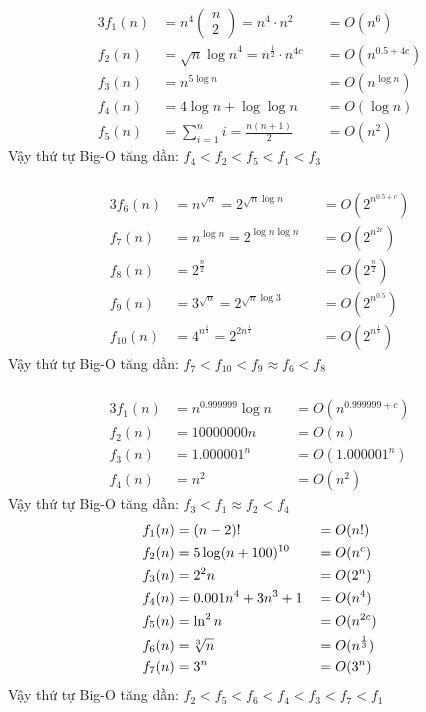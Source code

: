 \subsubsection{}
\begin{alignat*}{3}
     f_1(n) &= n^4\left(\begin{matrix}
         n\\2
     \end{matrix}\right)=n^4\cdot n^2  &&=O(n^6) \\
     f_2(n) &= \sqrt{n}{\log n}^4 = n^\frac{1}{2}\cdot n^{4c} &&= O(n^{0.5+4c}) \\
     f_3(n) &= n^{5\log n} &&= O(n^{\log n}) \\
     f_4(n) &= 4\log n + \log \log n &&=O(\log n)\\
     f_5(n) &= \sum_{i=1}^n i = \frac{n(n+1)}{2} &&= O(n^2)
\end{alignat*}
Vậy thứ tự Big-O tăng dần: $f_4 < f_2 < f_5 < f_1 < f_3$
\subsubsection{}
\begin{alignat*}{3}
     f_6(n) &= n^{\sqrt{n}} = 2^{\sqrt{n} \log n} &&=O(2^{n^{0.5 +c}}) \\
     f_7(n) &= n^{\log n} = 2^{\log n \log n} &&= O(2^{n^{2c}}) \\
     f_8(n) &= 2^{\frac{n}{2}} &&= O(2^{\frac{n}{2}}) \\
     f_9(n) &= 3^{\sqrt{n}} = 2^{\sqrt{n} \log 3} &&=O(2^{n^{0.5}})\\
     f_{10}(n) &= 4^{n^{\frac{1}{4}}} = 2^{2n^{\frac{1}{4}}} &&= O(2^{n^{\frac{1}{4}}})
\end{alignat*}
Vậy thứ tự Big-O tăng dần: $f_7 < f_{10} < f_9 \approx f_6 < f_8$
\subsubsection{}
\begin{alignat*}{3}
     f_1(n) &= n^{0.999999}\log n &&=O(n^{0.999999 + c}) \\
     f_2(n) &= 10000000n &&= O(n) \\
     f_3(n) &= 1.000001^n &&= O(1.000001^n) \\
     f_4(n) &= n^2 &&=O(n^2)
\end{alignat*}
Vậy thứ tự Big-O tăng dần: $f_3 < f_1 \approx f_2 < f_4$
\begin{alignat*}{3}
     f_1(n) &= (n - 2)! &&=O(n!) \\
     f_2(n) &= 5\log(n+100)^{10} &&= O(n^c) \\
     f_3(n) &= 2^2n &&= O(2^n) \\
     f_4(n) &= 0.001n^4+3n^3+1 &&=O(n^4)\\
     f_5(n) &= \ln^2 n &&=O(n^{2c})\\
     f_6(n) &= \sqrt[\leftroot{2} 3]{n} &&=O(n^\frac{1}{3})\\
     f_7(n) &= 3^n &&=O(3^n)     
\end{alignat*}
Vậy thứ tự Big-O tăng dần: $f_2 < f_5 < f_6 < f_4 < f_3 < f_7 < f_1$

